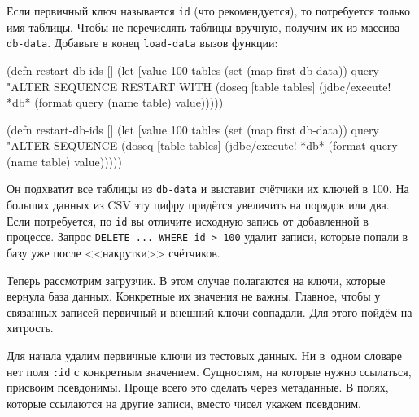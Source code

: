 \fi

Если первичный ключ называется \verb|id| (что рекомендуется), то потребуется
только имя таблицы. Чтобы не перечислять таблицы вручную, получим их из массива
\verb|db-data|. Добавьте в конец \verb|load-data| вызов функции:


\ifnarrow

\begin{english}
  \begin{clojure}
(defn restart-db-ids []
  (let [value 100
        tables (set (map first db-data))
        query "ALTER SEQUENCE %
               RESTART WITH %
    (doseq [table tables]
      (jdbc/execute! *db*
        (format query
          (name table) value)))))
  \end{clojure}
\end{english}

\else

\begin{english}
  \begin{clojure}
(defn restart-db-ids []
  (let [value 100
        tables (set (map first db-data))
        query "ALTER SEQUENCE %
    (doseq [table tables]
      (jdbc/execute! *db*
         (format query (name table) value)))))
  \end{clojure}
\end{english}

\fi

Он подхватит все таблицы из \verb|db-data| и выставит счётчики их ключей в
100. На больших данных из CSV эту цифру придётся увеличить на порядок или
два. Если потребуется, по \verb|id| вы отличите исходную запись от добавленной в
процессе. Запрос \verb|DELETE ... WHERE id > 100| удалит записи, которые попали
в базу уже после <<накрутки>> счётчиков.

Теперь рассмотрим загрузчик. В этом случае полагаются на ключи, которые вернула
база данных. Конкретные их значения не важны. Главное, чтобы у связанных записей
первичный и внешний ключи совпадали. Для этого пойдём на хитрость.

Для начала удалим первичные ключи из тестовых данных. Ни в~одном словаре нет
поля \verb|:id| с конкретным значением. Сущностям, на которые нужно ссылаться,
присвоим псевдонимы. Проще всего это сделать через метаданные. В полях, которые
ссылаются на другие записи, вместо чисел укажем псевдоним.



